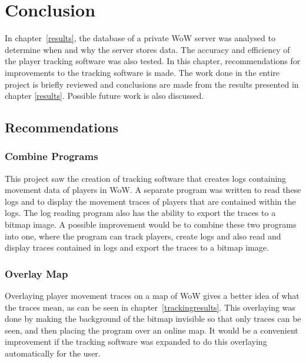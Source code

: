 \chapter{Conclusion}
\label{conclusion}
In chapter~\ref{results}, the database of a private WoW server was analysed to determine when and why the server stores data. The accuracy and efficiency of the player tracking software was also tested. In this chapter, recommendations for improvements to the tracking software is made. The work done in the entire project is briefly reviewed and conclusions are made from the results presented in chapter \ref{results}. Possible future work is also discussed.


\section{Recommendations}

\subsection{Combine Programs}

This project saw the creation of tracking software that creates logs containing movement data of players in WoW. A separate program was written to read these logs and to display the movement traces of players that are contained within the logs. The log reading program also has the ability to export the traces to a bitmap image. A possible improvement would be to combine these two programs into one, where the program can track players, create logs and also read and display traces contained in logs and export the traces to a bitmap image.


\subsection{Overlay Map}

Overlaying player movement traces on a map of WoW gives a better idea of what the traces mean, as can be seen in chapter~\ref{trackingresults}. This overlaying was done by making the background of the bitmap invisible so that only traces can be seen, and then placing the program over an online map. It would be a convenient improvement if the tracking software was expanded to do this overlaying automatically for the user.


